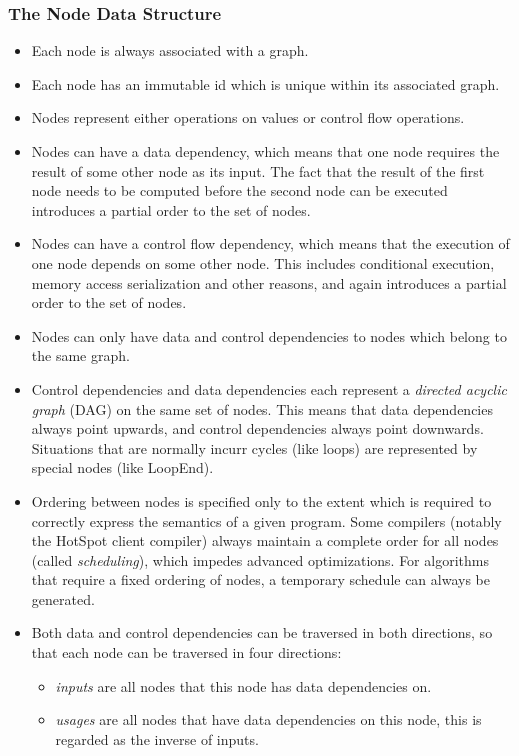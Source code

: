 \documentclass[twocolumn]{svjour3}
\begin{document}
\subsubsection{The Node Data Structure}
\begin{itemize}
    \item Each node is always associated with a graph.
    \item Each node has an immutable id which is unique within its associated graph.
    \item Nodes represent either operations on values or control flow operations.
    \item Nodes can have a data dependency, which means that one node requires the result of some other node as its input. The fact that the result of the first node needs to be computed before the second node can be executed introduces a partial order to the set of nodes.
    \item Nodes can have a control flow dependency, which means that the execution of one node depends on some other node. This includes conditional execution, memory access serialization and other reasons, and again introduces a partial order to the set of nodes.
    \item Nodes can only have data and control dependencies to nodes which belong to the same graph.
    \item Control dependencies and data dependencies each represent a \emph{directed acyclic graph} (DAG) on the same set of nodes. This means that data dependencies always point upwards, and control dependencies always point downwards. Situations that are normally incurr cycles (like loops) are represented by special nodes (like LoopEnd).
    \item Ordering between nodes is specified only to the extent which is required to correctly express the semantics of a given program. Some compilers (notably the HotSpot client compiler) always maintain a complete order for all nodes (called \emph{scheduling}), which impedes advanced optimizations. For algorithms that require a fixed ordering of nodes, a temporary schedule can always be generated.
    \item Both data and control dependencies can be traversed in both directions, so that each node can be traversed in four directions:
    \begin{itemize}
        \item \emph{inputs} are all nodes that this node has data dependencies on.
        \item \emph{usages} are all nodes that have data dependencies on this node, this is regarded as the inverse of inputs.

\end{itemize}
\end{itemize}
\end{document}
